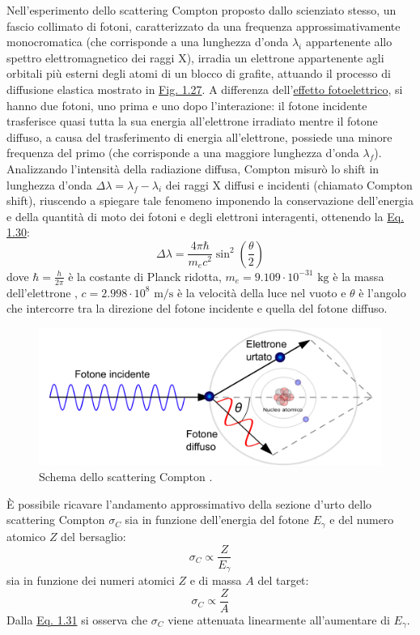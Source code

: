 \documentclass[12pt,a4paper,twoside]{report}
\begin{document}
	Nell'esperimento dello scattering Compton proposto dallo scienziato stesso, un fascio collimato di fotoni, caratterizzato da una frequenza approssimativamente monocromatica (che corrisponde a una lunghezza d'onda $\lambda_i$ appartenente allo spettro elettromagnetico dei raggi X), irradia un elettrone appartenente agli orbitali più esterni degli atomi di un blocco di grafite, attuando il processo di diffusione elastica mostrato in \hyperref[fig:compton]{Fig. 1.27}. A differenza dell'\hyperref[par:effetto_fotoelettrico]{effetto fotoelettrico}, si hanno due fotoni, uno prima e uno dopo l'interazione: il fotone incidente trasferisce quasi tutta la sua energia all'elettrone irradiato mentre il fotone diffuso, a causa del trasferimento di energia all'elettrone, possiede una minore frequenza del primo (che corrisponde a una maggiore lunghezza d'onda $\lambda_f$). Analizzando l'intensità della radiazione diffusa, Compton misurò lo shift in lunghezza d'onda $\Delta \lambda=\lambda_f-\lambda_i$ dei raggi X diffusi e incidenti (chiamato Compton shift), riuscendo a spiegare tale fenomeno imponendo la conservazione dell'energia e della quantità di moto dei fotoni e degli elettroni interagenti, ottenendo la \hyperref[eq:compton]{Eq. 1.30}:
	\begin{equation}
		\Delta \lambda=\frac{4\pi\hbar}{m_ec^2}\sin^2{\left(\frac{\theta}{2}\right)}
		\label{eq:compton}
	\end{equation}
	dove $\hbar=\frac{h}{2\pi}$ è la costante di Planck ridotta, $m_e=9.109\cdot10^{-31}\mbox{ kg}$ è la massa dell'elettrone \cite{electronMass}, $c=2.998\cdot10^{8}\mbox{ m/s}$ è la velocità della luce nel vuoto \cite{soliv} e $\theta$ è l'angolo che intercorre tra la direzione del fotone incidente e quella del fotone diffuso.
	\begin{figure}[H]
		\centering
		\includegraphics[width=0.9\linewidth]{compton.pdf}
		\caption{Schema dello scattering Compton \cite{comptScatt}.}
		\label{fig:compton}
	\end{figure}
	\`E possibile ricavare l'andamento approssimativo della sezione d'urto dello scattering Compton $\sigma_{C}$ sia in funzione dell'energia del fotone $E_\gamma$ e del numero atomico $Z$ del bersaglio:
	\begin{equation}
		\sigma_{C}\propto \frac{Z}{E_\gamma}
		\label{eq:sigma_c1}
	\end{equation}
	sia in funzione dei numeri atomici $Z$ e di massa $A$ del target:
	\begin{equation}
		\sigma_{C}\propto \frac{Z}{A}
		\label{eq:sigma_c2}
	\end{equation}
	Dalla \hyperref[eq:sigma_c1]{Eq. 1.31} si osserva che $\sigma_{C}$ viene attenuata linearmente all'aumentare di $E_\gamma$.
	
\end{document}
